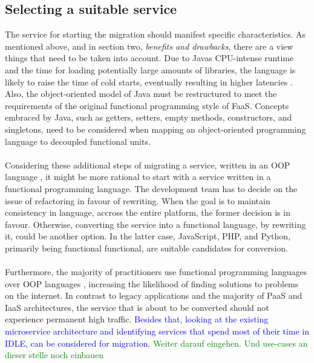 \documentclass[a4paper,twoside,11pt, pagesize]{scrartcl}
\begin{document}
\subsection{Selecting a suitable service}
The service for starting the migration should manifest specific characteristics. As mentioned above, and in section two, \textit{benefits and drawbacks}, there are a view things that need to be taken into account. Due to Javas CPU-intense runtime and the time for loading potentially large amounts of libraries, the language is likely to raise the time of cold starts, eventually resulting in higher latencies \cite{bardsley2018serverless}. Also, the object-oriented model of Java must be restructured to meet the requirements of the original functional programming style of FaaS. Concepts embraced by Java, such as getters, setters, empty methods, constructors, and singletons, need to be considered when mapping an object-oriented programming language to decoupled functional units.\\\\ Considering these additional steps of migrating a service, written in an OOP language \cite{leitner2019mixed}, it might be more rational to start with a service written in a functional programming language. The development team has to decide on the issue of refactoring in favour of rewriting. When the goal is to maintain consistency in language, accross the entire platform, the former decision is in favour. Otherwise, converting the service into a functional language, by rewriting it, could be another option. In the latter case, JavaScript, PHP, and Python, primarily being functional functional, are suitable candidates for conversion.\\\\ Furthermore, the majority of practitioners use functional programming languages over OOP languages \cite{leitner2019mixed}, increasing the likelihood of finding solutions to problems on the internet. In contrast to legacy applications and the majority of PaaS and IaaS architectures, the service that is about to be converted should not experience permanent high traffic. \textcolor{blue}{Besides that, looking at the existing microservice architecture and identifying services that spend most of their time in IDLE, can be considered for migration.} \textcolor{green}{Weiter darauf eingehen. Und use-cases an dieser stelle noch einbauen}
\end{document}

